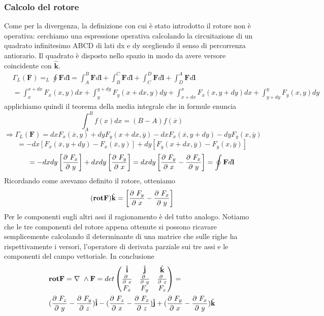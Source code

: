 \documentclass[
10pt, %
a4paper, %
oneside, %
headinclude,footinclude, %
BCOR5mm, %
]{scrartcl}
\begin{document}
\subsubsection{Calcolo del rotore}
Come per la divergenza, la definizione con cui è stato introdotto il rotore non è operativa: cerchiamo una espressione operativa calcolando la circuitazione di un quadrato infinitesimo ABCD di lati dx e dy scegliendo il senso di percorrenza antiorario. Il quadrato è disposto nello spazio in modo da avere versore coincidente con $\hat{\mathbf{k}}$. 
\begin{align*}
	&\Gamma_L(\mathbf{F}) = _L\oint \mathbf{F} d\mathbf{l} = \int_{A}^{B} \mathbf{F} d\mathbf{l}+\int_{B}^{C} \mathbf{F} d\mathbf{l}+\int_{C}^{D} \mathbf{F} d\mathbf{l}+\int_{D}^{A} \mathbf{F} d\mathbf{l}\\
	&= \int_{x}^{x+dx} F_x(x,y) dx+\int_{y}^{y+dy} F_y(x+dx,y) dy+\int_{x+dx}^{x} F_x(x, y+dy) dx+\int_{y+dy}^{y} F_y(x, y) dy
\end{align*}  
applichiamo quindi il teorema della media integrale che in formule enuncia
\[\int_{A}^{B}f(x)dx=(B-A)f(\overline{x})\]
\[\Rightarrow\Gamma_L(\mathbf{F}) = dxF_x(\overline{x}, y)+dyF_y(x+dx, \overline{y})-dxF_x(\overline{x}, y+dy)-dyF_y(x, \overline{y})\]
\[=-dx[F_x(\overline{x}, y+dy)-F_x(\overline{x}, y)]+dy[F_y(x+dx, \overline{y})-F_y(x, \overline{y})]\]
\[=-dxdy\left[\frac{\partial\  F_x}{\partial\  y}\right]+dxdy\left[\frac{\partial\  F_y}{\partial\  x}\right] = dxdy\left[\frac{\partial\  F_y}{\partial\  x}-\frac{\partial\  F_x}{\partial\  y}\right]=\oint\mathbf{F}d\mathbf{l}\]
Ricordando come avevamo definito il rotore, otteniamo 
\[(\mathbf{rot}\mathbf{F})\hat{\mathbf{k}} = \left[\frac{\partial\  F_y}{\partial\  x}-\frac{\partial\  F_x}{\partial\  y}\right]\]
Per le componenti sugli altri assi il ragionamento è del tutto analogo. Notiamo che le tre componenti del rotore appena ottenute si possono ricavare semplicemente calcolando il determinante di una matrice che sulle righe ha rispettivamente i versori, l'operatore di derivata parziale sui tre assi e le componenti del campo vettoriale. In conclusione
\begin{align*}
&\mathbf{rot}\mathbf{F}=\mathbf{\nabla\ }\wedge\mathbf{F}=det
\begin{pmatrix}
	\hat{\mathbf{i}}&\hat{\mathbf{j}}&\hat{\mathbf{k}}\\
	\frac{\partial\ }{\partial\  x}&\frac{\partial\ }{\partial\  y}&\frac{\partial\ }{\partial\  z}\\
	F_x&F_y&F_z
\end{pmatrix}=\\
&(\frac{\partial\  F_z}{\partial\  y}-\frac{\partial\  F_y}{\partial\  z})\hat{\mathbf{i}}
-(\frac{\partial\  F_z}{\partial\  x}-\frac{\partial\  F_x}{\partial\  z})\hat{\mathbf{j}}
+(\frac{\partial\  F_y}{\partial\  x}-\frac{\partial\  F_x}{\partial\  y})\hat{\mathbf{k}}
\end{align*}
\end{document}
